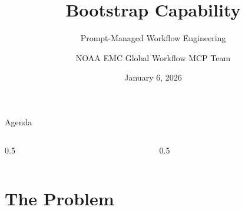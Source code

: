 \documentclass[aspectratio=169]{beamer}
\title{\textbf{Bootstrap Capability}}
\subtitle{Prompt-Managed Workflow Engineering}
\author{NOAA EMC Global Workflow MCP Team}
\institute{Environmental Modeling Center\\National Oceanic and Atmospheric Administration}
\date{January 6, 2026}
\begin{document}
\begin{frame}
\titlepage
\end{frame}

\begin{frame}{Agenda}
\begin{columns}[T]
\begin{column}{0.5\textwidth}
\tableofcontents[sections={1-4}]
\end{column}
\begin{column}{0.5\textwidth}
\tableofcontents[sections={5-8}]
\end{column}
\end{columns}
\end{frame}

\section{The Problem}
\end{document}
